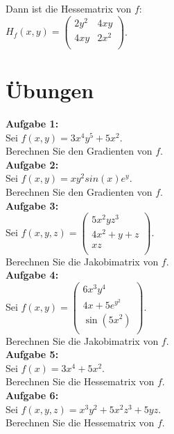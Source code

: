 \documentclass[11pt,final]{scrreprt}
\begin{document}
Dann ist die Hessematrix von $f$:\\
$H_f(x, y) = \left(\begin{matrix}
2y^2 & 4xy \\
4xy & 2x^2 \\
\end{matrix}\right)$.\\

\newpage
\section{Übungen}

\textbf{Aufgabe 1:}\\
Sei $f(x, y) = 3x^4y^5+5x^2 $.\\
Berechnen Sie den Gradienten von $f$.\\

\textbf{Aufgabe 2:}\\
Sei $f(x, y) = xy^2sin(x)e^y $.\\
Berechnen Sie den Gradienten von $f$.\\

\textbf{Aufgabe 3:}\\
Sei $f(x, y, z) = \left(\begin{matrix}
5x^2yz^3\\
4x^2+y+z \\
xz\\
\end{matrix}\right)$.\\
Berechnen Sie die Jakobimatrix von $f$.\\

\textbf{Aufgabe 4:}\\
Sei $f(x, y) = \left(\begin{matrix}
6x^3y^4\\
4x+5e^{y^2} \\
\sin(5x^2)\\
\end{matrix}\right)$.\\
Berechnen Sie die Jakobimatrix von $f$.\\

\textbf{Aufgabe 5:}\\
Sei $f(x) = 3x^4+5x^2 $.\\
Berechnen Sie die Hessematrix von $f$.\\

\textbf{Aufgabe 6:}\\
Sei $f(x, y, z) = x^3y^2+5x^2z^3+5yz $.\\
Berechnen Sie die Hessematrix von $f$.\\
\end{document}
